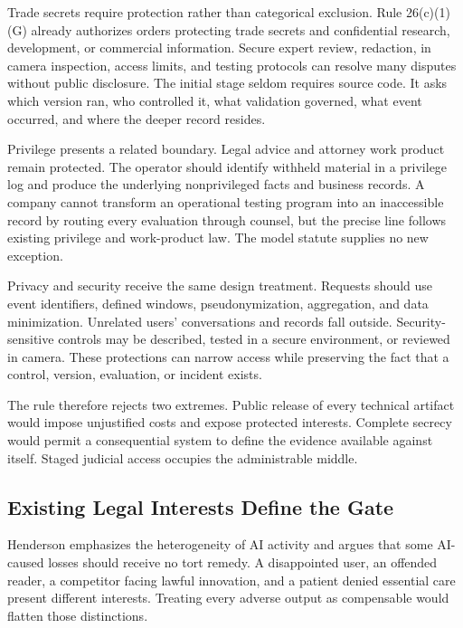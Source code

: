 Trade secrets require protection rather than categorical exclusion. Rule 26(c)(1)(G) already authorizes orders protecting trade secrets and confidential research, development, or commercial information. Secure expert review, redaction, in camera inspection, access limits, and testing protocols can resolve many disputes without public disclosure. The initial stage seldom requires source code. It asks which version ran, who controlled it, what validation governed, what event occurred, and where the deeper record resides.

Privilege presents a related boundary. Legal advice and attorney work product remain protected. The operator should identify withheld material in a privilege log and produce the underlying nonprivileged facts and business records. A company cannot transform an operational testing program into an inaccessible record by routing every evaluation through counsel, but the precise line follows existing privilege and work-product law. The model statute supplies no new exception.

Privacy and security receive the same design treatment. Requests should use event identifiers, defined windows, pseudonymization, aggregation, and data minimization. Unrelated users' conversations and records fall outside. Security-sensitive controls may be described, tested in a secure environment, or reviewed in camera. These protections can narrow access while preserving the fact that a control, version, evaluation, or incident exists.

The rule therefore rejects two extremes. Public release of every technical artifact would impose unjustified costs and expose protected interests. Complete secrecy would permit a consequential system to define the evidence available against itself. Staged judicial access occupies the administrable middle.

\subsection{Existing Legal Interests Define the Gate}

Henderson emphasizes the heterogeneity of AI activity and argues that some AI-caused losses should receive no tort remedy. A disappointed user, an offended reader, a competitor facing lawful innovation, and a patient denied essential care present different interests. Treating every adverse output as compensable would flatten those distinctions.

